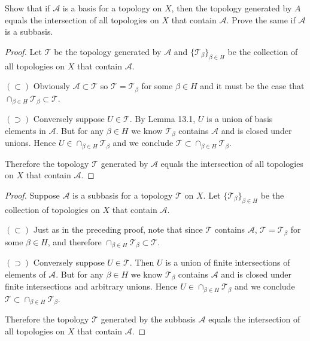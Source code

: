 \documentclass[11pt]{article}
\begin{document}



\begin{ex}{13.5}
  Show that if $\mathcal{A}$ is a basis for a topology on $X$, then the topology
  generated by $A$ equals the intersection of all topologies on $X$ that contain
  $\mathcal{A}$. Prove the same if $\mathcal{A}$ is a subbasis.
\end{ex}

\begin{proof}
  Let $\mathcal{T}$ be the topology generated by $\mathcal{A}$
  and $\{\mathcal{T}_\beta\}_{\beta \in H}$ be the collection of all topologies on $X$ that
  contain $\mathcal{A}$.

  $(\subset)$ Obviously $\mathcal{A} \subset \mathcal{T}$ so $\mathcal{T} =
  \mathcal{T}_\beta$ for some $\beta \in H$ and it must be the case that $\cap_{\beta \in
  H}\mathcal{T}_\beta \subset \mathcal{T}$.

  $(\supset)$ Conversely suppose $U \in \mathcal{T}$. By Lemma 13.1,
  $U$ is a union of basis elements in $\mathcal{A}$.
  But for any $\beta \in H$ we know $\mathcal{T}_\beta$ contains $\mathcal{A}$
  and is closed under unions. Hence $U \in \cap_{\beta \in
  H}\mathcal{T}_\beta$ and we conclude $\mathcal{T} \subset \cap_{\beta \in H}\mathcal{T}_\beta$.

  Therefore the topology $\mathcal{T}$ generated by $\mathcal{A}$ equals the
  intersection of all topologies on $X$ that contain $\mathcal{A}$.
\end{proof}

\begin{proof}
  Suppose $\mathcal{A}$ is a subbasis for a topology $\mathcal{T}$ on $X$. Let
  $\{\mathcal{T}_\beta\}_{\beta \in H}$ be the collection of topologies on
  $X$ that contain $\mathcal{A}$.

  $(\subset)$ Just as in the preceding proof, note that since
  $\mathcal{T}$ contains $\mathcal{A}$, $\mathcal{T} = \mathcal{T}_\beta$ for
  some $\beta \in H$, and therefore $\cap_{\beta \in
  H}\mathcal{T}_\beta \subset \mathcal{T}$.

  $(\supset)$ Conversely suppose $U \in \mathcal{T}$. Then $U$ is a union of
  finite intersections of elements of $\mathcal{A}$. But for any $\beta \in H$
  we know $\mathcal{T}_\beta$ contains $\mathcal{A}$ and is closed under finite
  intersections and arbitrary unions. Hence $U \in \cap_{\beta \in
  H}\mathcal{T}_\beta$ and we conclude $\mathcal{T} \subset \cap_{\beta \in
H}\mathcal{T}_\beta$.

  Therefore the topology $\mathcal{T}$ generated by the subbasis $\mathcal{A}$ equals the
  intersection of all topologies on $X$ that contain $\mathcal{A}$.
  \end{proof}
\end{document}
